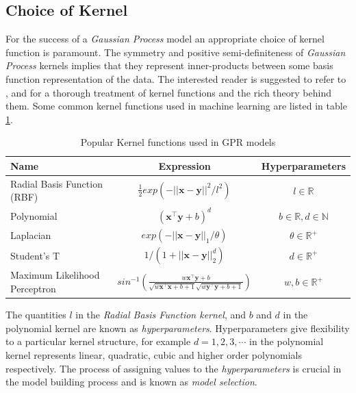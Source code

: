 \documentclass{article}
\begin{document}
\subsection{Choice of Kernel}

For the success of a \emph{Gaussian Process} model an appropriate choice of kernel function is paramount. The symmetry and positive semi-definiteness of \emph{Gaussian Process} kernels implies that they represent inner-products between some basis function representation of the data. The interested reader is suggested to refer to \citet{Berlinet2004}, \citet{Scholkopf:2001:LKS:559923} and \citet{hofmann2008} for a thorough treatment of kernel functions and the rich theory behind them. Some common kernel functions used in machine learning are listed in table \ref{table:kernel}.

\begin{table}[h]
  \caption{Popular Kernel functions used in GPR models}
  \centering
  \begin{tabular}{l c c}
    \hline
    Name  & Expression & Hyperparameters  \\
    \hline
    Radial Basis Function (RBF)  & $\frac{1}{2} exp(-||\mathbf{x} - \mathbf{y}||^2/l^2)$  & $l \in \mathbb{R}$   \\
    
    Polynomial  & $(\mathbf{x}^\intercal \mathbf{y} + b)^d$ & $b \in \mathbb{R}, d \in \mathbb{N}$   \\
    
    Laplacian  & $exp(-||\mathbf{x} - \mathbf{y}||_{1}/\theta)$  & $\theta \in \mathbb{R}^+$  \\
    
    Student's T  & $1/(1 + ||\mathbf{x} - \mathbf{y}||_{2}^d)$ & $d \in \mathbb{R}^{+}$\\
    
    Maximum Likelihood Perceptron  & $sin^{-1}(\frac{w\mathbf{x}^\intercal \mathbf{y} + b}{\sqrt{w\mathbf{x}^\intercal \mathbf{x} + b + 1} \sqrt{w\mathbf{y}^\intercal \mathbf{y} + b + 1}})$ & $w, b \in \mathbb{R}^{+}$\\
    \hline
  \end{tabular}
  \label{table:kernel}
\end{table}

The quantities $l$ in the \emph{Radial Basis Function kernel}, and $b$ and $d$ in the polynomial kernel are known as \emph{hyperparameters}. Hyperparameters give flexibility to a particular kernel structure, for example $d = 1, 2, 3, \cdots$ in the polynomial kernel represents linear, quadratic, cubic and higher order polynomials respectively. The process of assigning values to the \emph{hyperparameters} is crucial in the model building process and is known as \emph{model selection}. 
\end{document}
